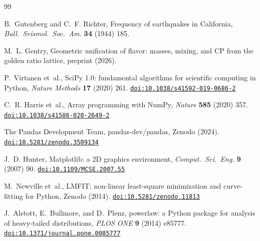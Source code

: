 \documentclass[preprint,12pt]{elsarticle}
\newcommand{\doi}[1]{\href{https://doi.org/#1}{\texttt{doi:#1}}}
\begin{document}
\begin{thebibliography}{99}

B.~Gutenberg and C.~F. Richter,
Frequency of earthquakes in California,
\textit{Bull.\ Seismol.\ Soc.\ Am.} \textbf{34} (1944) 185.

M.~L. Gentry,
Geometric unification of flavor: masses, mixing, and CP
from the golden ratio lattice,
preprint (2026).

P.~Virtanen et~al.,
SciPy 1.0: fundamental algorithms for scientific computing in Python,
\textit{Nature Methods} \textbf{17} (2020) 261.
\doi{10.1038/s41592-019-0686-2}

C.~R. Harris et~al.,
Array programming with NumPy,
\textit{Nature} \textbf{585} (2020) 357.
\doi{10.1038/s41586-020-2649-2}

The Pandas Development Team,
pandas-dev/pandas,
Zenodo (2024).
\doi{10.5281/zenodo.3509134}

J.~D. Hunter,
Matplotlib: a 2D graphics environment,
\textit{Comput.\ Sci.\ Eng.} \textbf{9} (2007) 90.
\doi{10.1109/MCSE.2007.55}

M.~Newville et~al.,
LMFIT: non-linear least-square minimization and
curve-fitting for Python,
Zenodo (2014).
\doi{10.5281/zenodo.11813}

J.~Alstott, E.~Bullmore, and D.~Plenz,
powerlaw: a Python package for analysis of heavy-tailed distributions,
\textit{PLOS ONE} \textbf{9} (2014) e85777.
\doi{10.1371/journal.pone.0085777}

\end{thebibliography}
\end{document}
